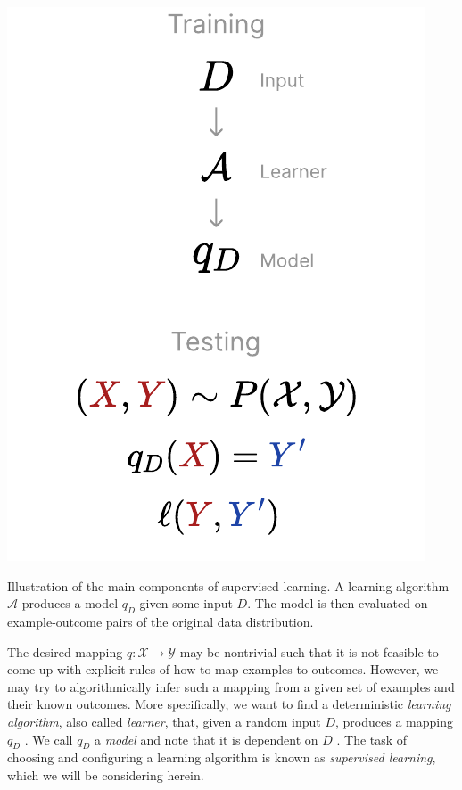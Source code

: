 \documentclass[
    a4paper, %
	fontsize=10pt, %
	twoside=false, %
]{kaobook}
\begin{document}
\begin{marginfigure}
	\includegraphics[width=\textwidth]{figma-illustrations/supervised-learning}
	\label{fig:supervised-learning}
	\caption{Illustration of the main components of supervised learning. A learning algorithm $\mathcal{A}$ produces a model $q_D$ given some input $D$. The model is then evaluated on example-outcome pairs of the original data distribution.}
\end{marginfigure}

The desired mapping $q: \mathcal{X} \to \mathcal{Y}$ may be nontrivial such that it is not feasible to come up with explicit rules of how to map examples to outcomes. However, we may try to algorithmically infer such a mapping from a given set of examples and their known outcomes. More specifically, we want to find a deterministic \textit{learning algorithm}, also called \textit{learner}, that, given a random input $D$, produces a mapping $q_D$
.
We call $q_D$ a \textit{model} and note that it is dependent on $D$ .
The task of choosing and configuring a learning algorithm is known as \textit{supervised learning}, which we will be considering herein. 
\end{document}
